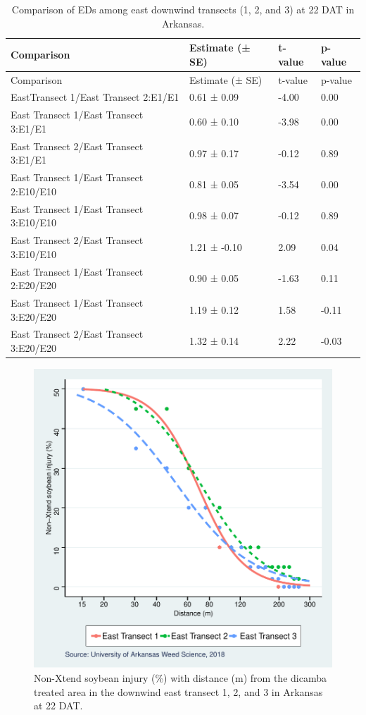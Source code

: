 \documentclass[]{article}
\begin{document}
\begin{longtable}[]{@{}llll@{}}
\caption{Comparison of EDs among east downwind transects (1, 2, and 3)
at 22 DAT in Arkansas.}\tabularnewline
\toprule
Comparison & Estimate (± SE) & t-value & p-value\tabularnewline
\midrule
\endfirsthead
\toprule
Comparison & Estimate (± SE) & t-value & p-value\tabularnewline
\midrule
\endhead
EastTransect 1/East Transect 2:E1/E1 & 0.61 ± 0.09 & -4.00 &
0.00\tabularnewline
East Transect 1/East Transect 3:E1/E1 & 0.60 ± 0.10 & -3.98 &
0.00\tabularnewline
East Transect 2/East Transect 3:E1/E1 & 0.97 ± 0.17 & -0.12 &
0.89\tabularnewline
East Transect 1/East Transect 2:E10/E10 & 0.81 ± 0.05 & -3.54 &
0.00\tabularnewline
East Transect 1/East Transect 3:E10/E10 & 0.98 ± 0.07 & -0.12 &
0.89\tabularnewline
East Transect 2/East Transect 3:E10/E10 & 1.21 ± -0.10 & 2.09 &
0.04\tabularnewline
East Transect 1/East Transect 2:E20/E20 & 0.90 ± 0.05 & -1.63 &
0.11\tabularnewline
East Transect 1/East Transect 3:E20/E20 & 1.19 ± 0.12 & 1.58 &
-0.11\tabularnewline
East Transect 2/East Transect 3:E20/E20 & 1.32 ± 0.14 & 2.22 &
-0.03\tabularnewline
\bottomrule
\end{longtable}

\begin{figure}
\centering
\includegraphics{Report_Dicamba_study_files/figure-latex/unnamed-chunk-12-1.pdf}
\caption{Non-Xtend soybean injury (\%) with distance (m) from the
dicamba treated area in the downwind east transect 1, 2, and 3 in
Arkansas at 22 DAT.}
\end{figure}
\end{document}

